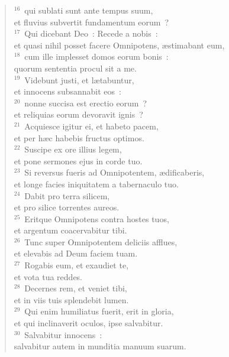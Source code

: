 \begin{flushleft}
\begin{verse}
${}^{16}$~qui sublati sunt ante tempus suum,\\ et fluvius subvertit fundamentum eorum~?\\
${}^{17}$~Qui dicebant Deo~: Recede a nobis~:\\ et quasi nihil posset facere Omnipotens, \ae stimabant eum,\\
${}^{18}$~cum ille implesset domos eorum bonis~:\\ quorum sententia procul sit a me.\\
${}^{19}$~Videbunt justi, et l\ae tabuntur,\\ et innocens subsannabit eos~:\\
${}^{20}$~nonne succisa est erectio eorum~?\\ et reliquias eorum devoravit ignis~?\\
${}^{21}$~Acquiesce igitur ei, et habeto pacem,\\ et per h\ae c habebis fructus optimos.\\
${}^{22}$~Suscipe ex ore illius legem,\\ et pone sermones ejus in corde tuo.\\
${}^{23}$~Si reversus fueris ad Omnipotentem, \ae dificaberis,\\ et longe facies iniquitatem a tabernaculo tuo.\\
${}^{24}$~Dabit pro terra silicem,\\ et pro silice torrentes aureos.\\
${}^{25}$~Eritque Omnipotens contra hostes tuos,\\ et argentum coacervabitur tibi.\\
${}^{26}$~Tunc super Omnipotentem deliciis afflues,\\ et elevabis ad Deum faciem tuam.\\
${}^{27}$~Rogabis eum, et exaudiet te,\\ et vota tua reddes.\\
${}^{28}$~Decernes rem, et veniet tibi,\\ et in viis tuis splendebit lumen.\\
${}^{29}$~Qui enim humiliatus fuerit, erit in gloria,\\ et qui inclinaverit oculos, ipse salvabitur.\\
${}^{30}$~Salvabitur innocens~:\\ salvabitur autem in munditia manuum suarum.\end{verse}\end{flushleft}



